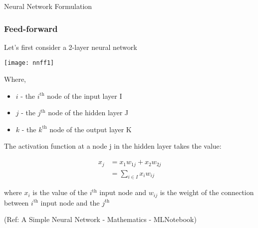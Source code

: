 




\begin{frame}
  \begin{center}
    {\Large Neural Network Formulation}

  \end{center}
\end{frame}

\begin{frame}[fragile] \frametitle{Feed-forward}
Let’s first consider a 2-layer neural network

\begin{center}
\texttt{[image: nnff1]}
\end{center}

Where,
\begin{itemize}
\item $i$ - the $i^{\text{th}}$ node of the input layer I
\item $j$ - the $j^{\text{th}}$ node of the hidden layer J
\item $k$ - the $k^{\text{th}}$ node of the output layer K
\end{itemize}

The activation function at a node j in the hidden layer takes the value:

\begin{align}
x_{j} &= x_{1} w_{1j} + x_{2} w_{2j} \\[0.5em]
&= \sum_{i \in I} x_{i} w_{i j}
\end{align}

where $x_{i}$ is the value of the $i^{\text{th}}$ input node and $w_{i j}$ is the weight of the connection between $i^{\text{th}}$ input node and the  $j^{\text{th}}$

\tiny{(Ref: A Simple Neural Network - Mathematics - MLNotebook)}
\end{frame}

